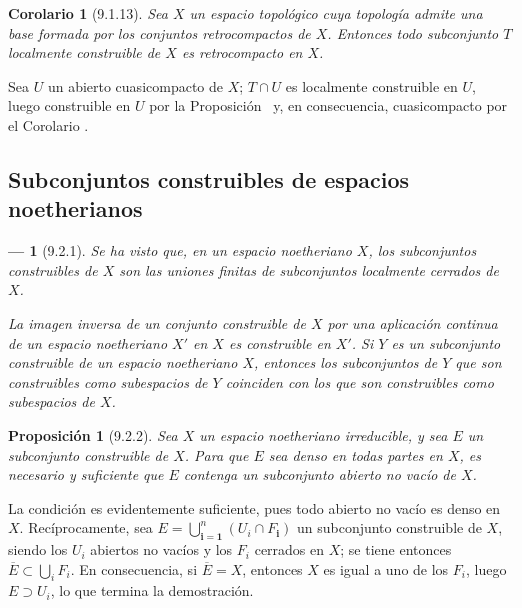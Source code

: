 \documentclass[10pt,oneside,openany]{book}
\theoremstyle{egaenv}\newtheorem*{env}{---}
\theoremstyle{egastatement}
\newtheorem*{proposition}{Proposición}
\newtheorem*{corollary}{Corolario}
\theoremstyle{egadescription}
\newcommand{\oldpage}[2][]{\marginnote{\normalfont\scriptsize\textbf{#1}\,|\,#2}\ignorespaces}
\begin{document}
\begin{corollary}[9.1.13]
\label{0.9.1.13}
\label{0.9.1.13-fr}
Sea $X$ un espacio topológico cuya topología admite una base formada por los conjuntos retrocompactos de $X$.
Entonces todo subconjunto $T$ localmente construible de $X$ es retrocompacto en $X$.
\end{corollary}


Sea $U$ un abierto cuasicompacto de $X$; $T\cap U$ es localmente construible en $U$, luego construible en $U$ por la Proposición~ y, en consecuencia, cuasicompacto por el Corolario .


\subsection{Subconjuntos construibles de espacios noetherianos}
\label{subsection:0.9.2}
\label{subsection:0.9.2-fr}

\begin{env}[9.2.1]
\label{0.9.2.1}
\label{0.9.2.1-fr}
Se ha visto  que, en un espacio noetheriano $X$, los subconjuntos construibles de $X$ son las \emph{uniones finitas de subconjuntos localmente cerrados} de $X$.

La imagen inversa de un conjunto construible de $X$ por una aplicación continua de un espacio noetheriano $X'$ en $X$ es construible en $X'$.
Si $Y$ es un subconjunto construible de un espacio noetheriano $X$, entonces los subconjuntos de $Y$ que son construibles como subespacios de $Y$ coinciden con los que son construibles como subespacios de $X$.
\end{env}

\begin{proposition}[9.2.2]
\label{0.9.2.2}
\label{0.9.2.2-fr}
Sea $X$ un espacio noetheriano irreducible, y sea $E$ un subconjunto construible de $X$.
Para que $E$ sea denso en todas partes en $X$, es necesario y suficiente que $E$ contenga un subconjunto abierto no vacío de $X$.
\end{proposition}


\oldpage[0\textsubscript{III}]{15}
La condición es evidentemente suficiente, pues todo abierto no vacío es denso en $X$.
Recíprocamente, sea $E=\bigcup_{\boldsymbol{i}=\mathbf{1}}^n(U_i\cap F_{\boldsymbol{i}})$ un subconjunto construible de $X$, siendo los $U_i$ abiertos no vacíos y los $F_i$ cerrados en $X$; se tiene entonces $\overline{E}\subset\bigcup_i F_i$.
En consecuencia, si $\overline{E}=X$, entonces $X$ es igual a uno de los $F_i$, luego $E\supset U_i$, lo que termina la demostración.
\end{document}
